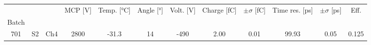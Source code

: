 \begin{tabular}{cccccccccccc}
\toprule
 &  &  & MCP [V] & Temp. [°C] & Angle [°] & Volt. [V] & Charge [fC] & \(\pm\sigma\) [fC] & Time res. [ps] & \(\pm\sigma\) [ps] & Eff. \\
Batch &  &  &  &  &  &  &  &  &  &  &  \\
\midrule
701 & S2 & Ch4 & 2800 & -31.3 & 14 & -490 & 2.00 & 0.01 & 99.93 & 0.05 & 0.125 \\
\bottomrule
\end{tabular}
